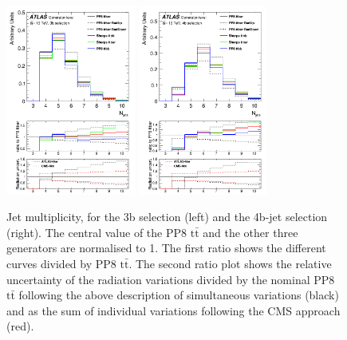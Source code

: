 \begin{figure}[!htb]
\centering
\includegraphics[width=0.38\textwidth]{Plots/ttbb/hisgenNjets_4j3t__div}
\includegraphics[width=0.38\textwidth]{Plots/ttbb/hisgenNjets_4j4t__div}
  \caption{Jet multiplicity, for the 3b selection (left) and the 4b-jet selection (right). The central value of the PP8 $\mathrm{t\bar{t}}$ and the other three generators are normalised to 1. The first ratio shows the different curves divided by PP8 $\mathrm{t\bar{t}}$. The second ratio plot shows the relative uncertainty of the radiation variations divided by the nominal PP8 $\mathrm{t\bar{t}}$ following the above description of simultaneous variations (black) and as the sum of individual variations following the CMS approach (red). \label{ttbb:Njets}}
\end{figure}

